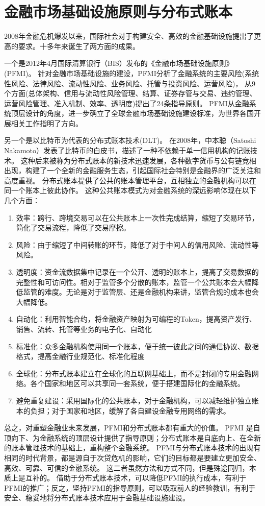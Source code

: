 \section{金融市场基础设施原则与分布式账本}\label{sec:pfmi}

2008年金融危机爆发以来，国际社会对于构建安全、高效的金融基础设施提出了更高的要求。十多年来诞生了两方面的成果。

一个是2012年4月国际清算银行（BIS）发布的《金融市场基础设施原则》(PFMI)\cite{pfmi}。
针对金融市场基础设施的建设，PFMI分析了金融系统的主要风险(系统性风险、法律风险、流动性风险、业务风险、托管与投资风险、运营风险)，
从9个方面(总体架构、信用与流动性风险管理、结算、证券存管与交易、违约管理、运营风险管理、准入机制、效率、透明度)提出了24条指导原则。
PFMI从金融系统顶层设计的角度，进一步确立了全球金融市场基础设施建设标准，为世界各国开展相关工作指明了方向。

另一个是以比特币为代表的分布式账本技术(DLT)。
在2008年，中本聪（Satoshi Nakamoto）发表了比特币的白皮书，描述了一种不依赖于单一信用机构的记账技术。
这种后来被称为分布式账本的新技术迅速发展，各种数字货币与公有链竞相出现，构建了一个全新的金融服务生态，引起国际社会特别是金融界的广泛关注和高度重视。
分布式账本提供了公共的账本管理平台，互相独立的金融机构可以在同一个账本上彼此协作。
这种公共账本模式为对金融系统的深远影响体现在以下几个方面：

\begin{enumerate}
    \item 效率：跨行、跨境交易可以在公共账本上一次性完成结算，缩短了交易环节，简化了交易流程，降低了交易摩擦。
    \item 风险：由于缩短了中间转账的环节，降低了对于中间人的信用风险、流动性等风险。
    \item 透明度：资金流数据集中记录在一个公开、透明的账本上，提高了交易数据的完整性和可访问性。相对于监管多个分散的账本，监管一个公共账本会大幅降低监管的难度。无论是对于监管层、还是金融机构来讲，监管合规的成本也会大幅降低。
    \item 自动化：利用智能合约，将金融资产映射为可编程的Token，提高资产发行、销售、流转、托管等业务的电子化、自动化
    \item 标准化：众多金融机构使用同一个账本，便于统一彼此之间的通信协议、数据格式，提高金融行业规范化、标准化程度
    \item 全球化：分布式账本建立在全球化的互联网基础上，而不是封闭的专用金融网络。各个国家和地区可以共享同一套系统，便于搭建国际化的金融系统。
    \item 避免重复建设：采用国际化的公共账本，对于金融机构，可以减轻维护独立账本的负担；对于国家和地区，缓解了各自建设金融专用网络的需求。
\end{enumerate}

总之，对重塑金融业未来发展，PFMI和分布式账本都有重大的价值。
PFMI 是自顶向下、为金融系统的顶层设计提供了指导原则；分布式账本是自底向上、在全新的账本管理技术的基础上，重构整个金融系统。
PFMI与分布式账本技术的出现有相同的时代背景，都是源自于次贷危机的影响，它们的目标都是要建立更加安全、高效、可靠、可信的金融系统。
这二者虽然方法和方式不同，但是殊途同归，本质上是互补的。
借助于分布式账本技术，可以降低PFMI的执行成本，有利于PFMI的推广；反之，坚持PFMI的指导原则，可以吸取前人的经验教训，有利于安全、稳妥地将分布式账本技术应用于金融基础设施建设。

